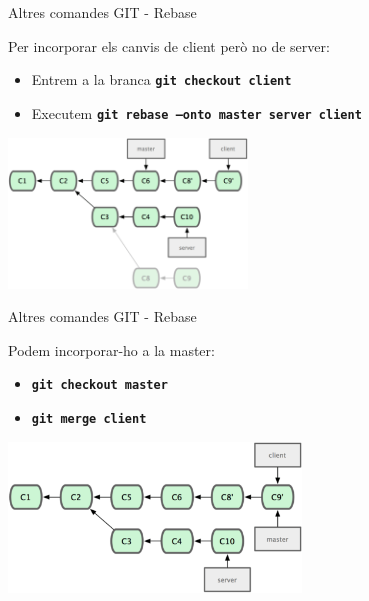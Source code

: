 \documentclass[10pt,xcolor={rgb}]{beamer}
\begin{document}
    \begin{frame}[fragile]{Altres comandes GIT - Rebase}

      \begin{block}{Per incorporar els canvis de client però no de server:}
      \begin{itemize}
        \item Entrem a la branca \texttt{\textbf{git checkout client}}
        \item Executem \texttt{\textbf{git rebase --onto master server client}}
      \end{itemize}

      \centering
      \includegraphics[height=4cm]{rebase5.png}

      \end{block}
    \end{frame}

    \begin{frame}[fragile]{Altres comandes GIT - Rebase}

      \begin{block}{Podem incorporar-ho a la master:}
      \begin{itemize}
        \item \texttt{\textbf{git checkout master}}
        \item \texttt{\textbf{git merge client}}
      \end{itemize}

      \centering
      \includegraphics[height=4cm]{rebase6.png}

      \end{block}
    \end{frame}
\end{document}
